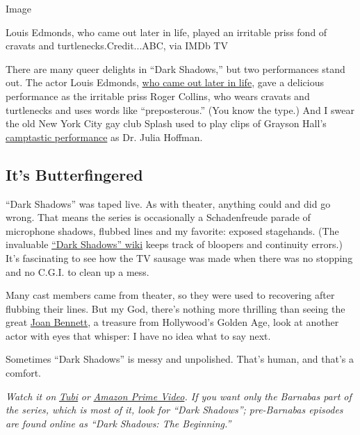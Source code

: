 Image

Louis Edmonds, who came out later in life, played an irritable priss
fond of cravats and turtlenecks.Credit...ABC, via IMDb TV

There are many queer delights in ``Dark Shadows,'' but two performances
stand out. The actor Louis Edmonds,
\href{http://weareflagrant.com/eleven-dark-shadows-actors-probably-didnt-know-gay/}{who
came out later in life}, gave a delicious performance as the irritable
priss Roger Collins, who wears cravats and turtlenecks and uses words
like ``preposterous.'' (You know the type.) And I swear the old New York
City gay club Splash used to play clips of Grayson Hall's
\href{https://www.youtube.com/watch?v=PmfVofgcYT0}{camptastic
performance} as Dr. Julia Hoffman.

\hypertarget{its-butterfingered}{%
\subsection{It's Butterfingered}\label{its-butterfingered}}

``Dark Shadows'' was taped live. As with theater, anything could and did
go wrong. That means the series is occasionally a Schadenfreude parade
of microphone shadows, flubbed lines and my favorite: exposed
stagehands. (The invaluable
\href{https://darkshadows.fandom.com/wiki/Dark_Shadows_Wiki}{``Dark
Shadows'' wiki} keeps track of bloopers and continuity errors.) It's
fascinating to see how the TV sausage was made when there was no
stopping and no C.G.I. to clean up a mess.

Many cast members came from theater, so they were used to recovering
after flubbing their lines. But my God, there's nothing more thrilling
than seeing the great
\href{http://www.collinsporthistoricalsociety.com/2012/04/look-back-at-joan-bennett-week.html}{Joan
Bennett}, a treasure from Hollywood's Golden Age, look at another actor
with eyes that whisper: I have no idea what to say next.

Sometimes ``Dark Shadows'' is messy and unpolished. That's human, and
that's a comfort.

\emph{Watch it on}
\href{https://tubitv.com/series/300004693/dark_shadows_the_beginning}{\emph{Tubi}}
\emph{or}
\href{https://www.amazon.com/gp/video/detail/B0143JHTFW/ref=atv_dp_share_cu_r}{\emph{Amazon
Prime Video}}\emph{. If you want only the Barnabas part of the series,
which is most of it, look for ``Dark Shadows''; pre-Barnabas episodes
are found online as ``Dark Shadows: The Beginning.''}

